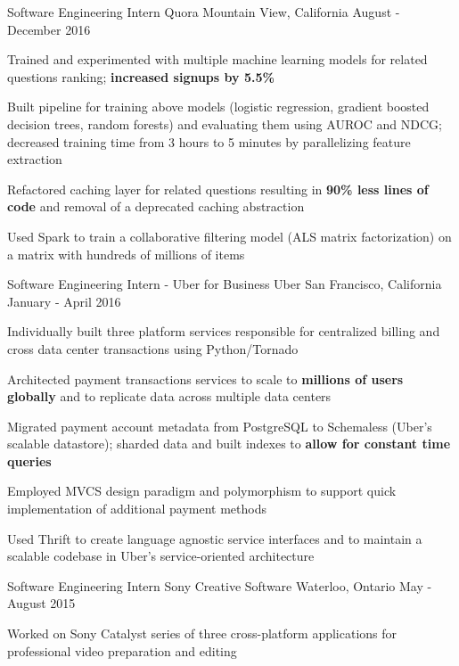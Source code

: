 \begin{cventries}
  \cventry
    {Software Engineering Intern}
    {Quora}
    {Mountain View, California}
    {August - December 2016}
    {
      \begin{cvitems}
      \item Trained and experimented with multiple machine learning models for related questions ranking; \textbf{increased signups by 5.5\%}
      \item Built pipeline for training above models (logistic regression, gradient boosted decision trees, random forests) and evaluating them using AUROC and NDCG; decreased training time from 3 hours to 5 minutes by parallelizing feature extraction
      \item Refactored caching layer for related questions resulting in \textbf{90\% less lines of code} and removal of a deprecated caching abstraction
      \item Used Spark to train a collaborative filtering model (ALS matrix factorization) on a matrix with hundreds of millions of items
      \end{cvitems}
    }
  \cventry
    {Software Engineering Intern - Uber for Business}
    {Uber}
    {San Francisco, California}
    {January - April 2016}
    {
      \begin{cvitems}
      \item Individually built three platform services responsible for centralized billing and cross data center transactions using Python/Tornado
      \item Architected payment transactions services to scale to \textbf{millions of users globally} and to replicate data across multiple data centers
      \item Migrated payment account metadata from PostgreSQL to Schemaless (Uber's scalable datastore); sharded data and built indexes to \textbf{allow for constant time queries}
      \item Employed MVCS design paradigm and polymorphism to support quick implementation of additional payment methods
      \item Used Thrift to create language agnostic service interfaces and to maintain a scalable codebase in Uber's service-oriented architecture
      \end{cvitems}
    }
  \cventry
    {Software Engineering Intern}
    {Sony Creative Software}
    {Waterloo, Ontario}
    {May - August 2015}
    {
      \begin{cvitems}
        \item Worked on Sony Catalyst series of three cross-platform applications for professional video preparation and editing

\end{cvitems}}
\end{cventries}
